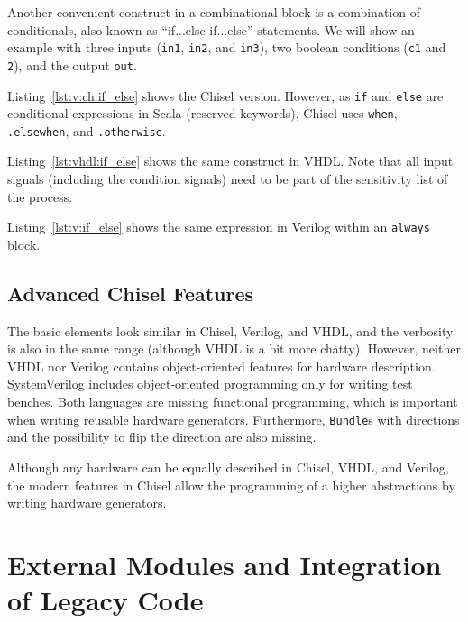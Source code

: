 \documentclass[%
    10pt,
    headinclude, footexclude,
    openright, %
    notitlepage,
    cleardoubleempty,
    headsepline,
    pointlessnumbers,
    bibtotoc, idxtotoc,
    ]{scrbook}
\newcommand{\code}[1]{{\lstinline[basicstyle=\small\ttfamily]{#1}}}
\begin{document}
Another convenient construct in a combinational block is a combination of
conditionals, also known as ``if...else if...else'' statements.
We will show an example with three inputs (\code{in1}, \code{in2}, and \code{in3}),
two boolean conditions (\code{c1} and \code{2}), and the output \code{out}.


Listing~\ref{lst:v:ch:if_else} shows the Chisel version. However, as \code{if} and
\code{else} are conditional expressions in Scala (reserved keywords), Chisel
uses \code{when}, \code{.elsewhen}, and \code{.otherwise}.


Listing~\ref{lst:vhdl:if_else} shows the same construct in VHDL. Note that all input
signals (including the condition signals) need to be part of the sensitivity list
of the process.


Listing~\ref{lst:v:if_else} shows the same expression in Verilog within an \code{always} block.



\subsection{Advanced Chisel Features}

The basic elements look similar in Chisel, Verilog, and VHDL, and the verbosity
is also in the same range (although VHDL is a bit more chatty).
However, neither VHDL nor Verilog contains object-oriented features for hardware
description. SystemVerilog includes object-oriented programming only for writing test benches.
Both languages are missing functional programming, which is important when
writing reusable hardware generators.
Furthermore, \code{Bundle}s with directions and the possibility to flip the direction
are also missing.

Although any hardware can be equally described in Chisel, VHDL, and Verilog,
the modern features in Chisel allow the programming of a higher abstractions by
writing hardware generators.

\section{External Modules and Integration of Legacy Code}
\end{document}
